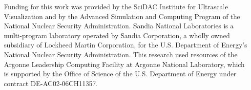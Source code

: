 \documentclass{sig-alternate}
\begin{document}
Funding for this work was provided by the SciDAC Institute for Ultrascale
Visualization and by the Advanced Simulation and Computing Program of
the National Nuclear Security Administration.
%
Sandia National Laboratories is a multi-program laboratory operated by
Sandia Corporation, a wholly owned subsidiary of Lockheed Martin
Corporation, for the U.S. Department of Energy's National Nuclear Security
Administration.
%
This research used resources of the Argonne Leadership Computing Facility
at Argonne National Laboratory, which is supported by the Office of Science
of the U.S. Department of Energy under contract DE-AC02-06CH11357.


%

\end{document}
